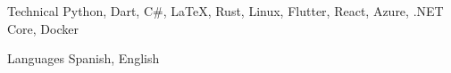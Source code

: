
\begin{cvskills}

  \cvskill
    {Technical} %
    {Python, Dart, C\#, LaTeX, Rust, Linux, Flutter, React, Azure, .NET Core, Docker} %





  \cvskill
    {Languages} %
    {Spanish, English} %

\end{cvskills}
